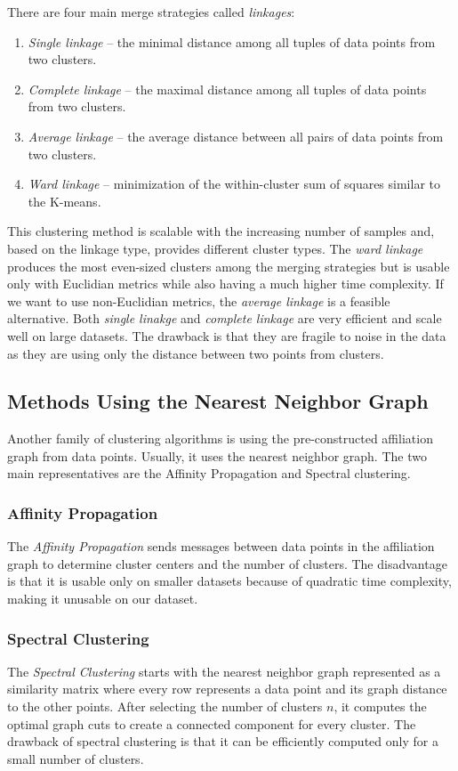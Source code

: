 There are four main merge strategies called \textit{linkages}:
\begin{enumerate}
    \item \textit{Single linkage} -- the minimal distance among all tuples of data points from two clusters.
    \item \textit{Complete linkage} -- the maximal distance among all tuples of data points from two clusters.
    \item \textit{Average linkage} -- the average distance between all pairs of data points from two clusters.
    \item \textit{Ward linkage} -- minimization of the within-cluster sum of squares similar to the K-means.
\end{enumerate}
This clustering method is scalable with the increasing number of samples and, based on the linkage type, provides different cluster types. The \textit{ward linkage} produces the most even-sized clusters among the merging strategies but is usable only with Euclidian metrics while also having a much higher time complexity. If we want to use non-Euclidian metrics, the \textit{average linkage} is a feasible alternative. Both \textit{single linakge} and \textit{complete linkage} are very efficient and scale well on large datasets. The drawback is that they are fragile to noise in the data as they are using only the distance between two points from clusters.

\subsection{Methods Using the Nearest Neighbor Graph}
Another family of clustering algorithms is using the pre-constructed affiliation graph from data points. Usually, it uses the nearest neighbor graph. The two main representatives are the Affinity Propagation and Spectral clustering. 
\subsubsection{Affinity Propagation}
The \textit{Affinity Propagation} \cite{vis:affini} sends messages between data points in the affiliation graph to determine cluster centers and the number of clusters.  The disadvantage is that it is usable only on smaller datasets because of quadratic time complexity, making it unusable on our dataset.

\subsubsection{Spectral Clustering}
The \textit{Spectral Clustering} \cite{vis:spectral} starts with the nearest neighbor graph represented as a similarity matrix where every row represents a data point and its graph distance to the other points. After selecting the number of clusters $n$, it computes the optimal graph cuts to create a connected component for every cluster. The drawback of spectral clustering is that it can be efficiently computed only for a small number of clusters.

